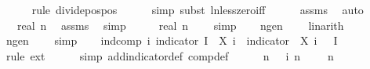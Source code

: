 \begin{isabellebody}
\ \ \ \ \isamarkupfalse%
\ {\isacharparenleft}{\kern0pt}rule\ divide{\isacharunderscore}{\kern0pt}pos{\isacharunderscore}{\kern0pt}pos{\isacharparenright}{\kern0pt}\isanewline
\ \ \ \ \isamarkupfalse%
\ {\isacharparenleft}{\kern0pt}simp{\isacharcomma}{\kern0pt}\ subst\ ln{\isacharunderscore}{\kern0pt}less{\isacharunderscore}{\kern0pt}zero{\isacharunderscore}{\kern0pt}iff{\isacharparenright}{\kern0pt}\isanewline
\ \ \ \ \isamarkupfalse%
\ assms\ \isamarkupfalse%
\ auto\isanewline
\ \ \isamarkupfalse%
\ \isamarkupfalse%
\ {\isachardoublequoteopen}{\isachardot}{\kern0pt}{\isachardot}{\kern0pt}{\isachardot}{\kern0pt}\ {\isasymle}\ real\ n{\isachardoublequoteclose}\ \isamarkupfalse%
\ assms\ \isamarkupfalse%
\ simp\isanewline
\ \ \isamarkupfalse%
\ \isamarkupfalse%
\ {\isachardoublequoteopen}real\ n\ {\isachargreater}{\kern0pt}\ {}{\isachardoublequoteclose}\ \isamarkupfalse%
\ simp\isanewline
\ \ \isamarkupfalse%
\ n{\isacharunderscore}{\kern0pt}ge{\isacharunderscore}{\kern0pt}{}{\isacharcolon}{\kern0pt}{\isachardoublequoteopen}n\ {\isasymge}\ {}{\isachardoublequoteclose}\ \isamarkupfalse%
\ linarith\isanewline
\ \ \isamarkupfalse%
\ n{\isacharunderscore}{\kern0pt}ge{\isacharunderscore}{\kern0pt}{}{\isacharcolon}{\kern0pt}{\isachardoublequoteopen}n\ {\isachargreater}{\kern0pt}\ {}{\isachardoublequoteclose}\ \isamarkupfalse%
\ simp\isanewline
\isanewline
\ \ \isamarkupfalse%
\ ind{\isacharunderscore}{\kern0pt}comp{\isacharcolon}{\kern0pt}\ {\isachardoublequoteopen}{\isasymAnd}i{\isachardot}{\kern0pt}\ indicator\ I\ {\isasymcirc}\ {\isacharparenleft}{\kern0pt}X\ i{\isacharparenright}{\kern0pt}\ {\isacharequal}{\kern0pt}\ indicator\ {\isacharbraceleft}{\kern0pt}{\isasymomega}{\isachardot}{\kern0pt}\ X\ i\ {\isasymomega}\ {\isasymin}\ I{\isacharbraceright}{\kern0pt}{\isachardoublequoteclose}\isanewline
\ \ \ \ \isamarkupfalse%
\ {\isacharparenleft}{\kern0pt}rule\ ext{\isacharparenright}{\kern0pt}\isanewline
\ \ \ \ \isamarkupfalse%
\ {\isacharparenleft}{\kern0pt}simp\ add{\isacharcolon}{\kern0pt}indicator{\isacharunderscore}{\kern0pt}def\ comp{\isacharunderscore}{\kern0pt}def{\isacharparenright}{\kern0pt}\isanewline
\isanewline
\ \ \isamarkupfalse%
\ {\isachardoublequoteopen}{\isasymalpha}\ {\isacharasterisk}{\kern0pt}\ n\ {\isasymle}\ {\isacharparenleft}{\kern0pt}{\isasymSum}\ i\ {\isacharequal}{\kern0pt}{}{\isachardot}{\kern0pt}{\isachardot}{\kern0pt}{\isacharless}{\kern0pt}n{\isachardot}{\kern0pt}\ {}{\isacharslash}{\kern0pt}{}\ {\isacharplus}{\kern0pt}\ {\isasymalpha}{\isacharparenright}{\kern0pt}\ {\isacharminus}{\kern0pt}\ n{\isacharslash}{\kern0pt}{}{\isachardoublequoteclose}\isanewline

\end{isabellebody}
